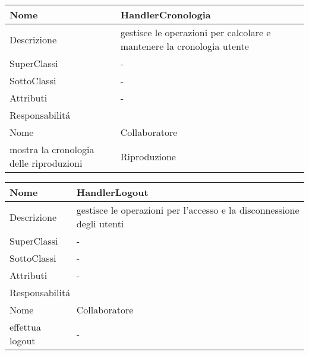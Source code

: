 \begin{center} %
    \begin{longtable}{ |p{3cm}|p{3cm}|p{3cm}|p{3cm}| }
        \hline
        Nome & \multicolumn{3}{|p{9cm}|}{HandlerCronologia} \\\hline
        Descrizione & \multicolumn{3}{|p{9cm}|}{gestisce le operazioni per calcolare e mantenere la cronologia utente} \\\hline
        SuperClassi & \multicolumn{3}{|p{9cm}|}{-} \\\hline
        SottoClassi & \multicolumn{3}{|p{9cm}|}{-} \\\hline
        Attributi & \multicolumn{3}{|p{9cm}|}{-} \\\hline
        \multicolumn{4}{|p{12cm}|}{Responsabilit\'a} \\\hline %
        \multicolumn{2}{|p{6cm}|}{Nome} & \multicolumn{2}{|p{6cm}|}{Collaboratore} \\\hline %
        \multicolumn{2}{|p{6cm}|}{mostra la cronologia delle riproduzioni} & \multicolumn{2}{|p{6cm}|}{Riproduzione} \\\hline
        \end{longtable}
\end{center}

\begin{center} %
    \begin{longtable}{ |p{3cm}|p{3cm}|p{3cm}|p{3cm}| }
        \hline
        Nome & \multicolumn{3}{|p{9cm}|}{HandlerLogout} \\\hline
        Descrizione & \multicolumn{3}{|p{9cm}|}{gestisce le operazioni per l'accesso e la disconnessione degli utenti} \\\hline
        SuperClassi & \multicolumn{3}{|p{9cm}|}{-} \\\hline
        SottoClassi & \multicolumn{3}{|p{9cm}|}{-} \\\hline
        Attributi & \multicolumn{3}{|p{9cm}|}{-} \\\hline
        \multicolumn{4}{|p{12cm}|}{Responsabilit\'a} \\\hline %
        \multicolumn{2}{|p{6cm}|}{Nome} & \multicolumn{2}{|p{6cm}|}{Collaboratore} \\\hline %
        \multicolumn{2}{|p{6cm}|}{effettua logout} & \multicolumn{2}{|p{6cm}|}{-} \\\hline
        \end{longtable}
\end{center}

